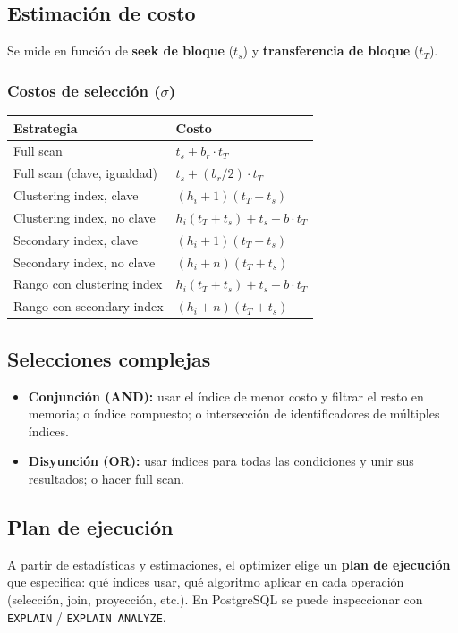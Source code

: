 \documentclass[12pt, a4paper]{article}
\begin{document}
\subsection{Estimación de costo}
Se mide en función de \textbf{seek de bloque} ($t_s$) y \textbf{transferencia de bloque} ($t_T$).

\subsubsection{Costos de selección ($\sigma$)}

\begin{tabularx}{\textwidth}{Xl}
\toprule
\textbf{Estrategia} & \textbf{Costo} \\
\midrule
Full scan & $t_s + b_r \cdot t_T$ \\
Full scan (clave, igualdad) & $t_s + (b_r/2) \cdot t_T$ \\
Clustering index, clave & $(h_i + 1)(t_T + t_s)$ \\
Clustering index, no clave & $h_i(t_T + t_s) + t_s + b \cdot t_T$ \\
Secondary index, clave & $(h_i + 1)(t_T + t_s)$ \\
Secondary index, no clave & $(h_i + n)(t_T + t_s)$ \\
Rango con clustering index & $h_i(t_T + t_s) + t_s + b \cdot t_T$ \\
Rango con secondary index & $(h_i + n)(t_T + t_s)$ \\
\bottomrule
\end{tabularx}

\subsection{Selecciones complejas}
\begin{itemize}
  \item \textbf{Conjunción (AND):} usar el índice de menor costo y filtrar el resto en memoria; o índice compuesto; o intersección de identificadores de múltiples índices.
  \item \textbf{Disyunción (OR):} usar índices para todas las condiciones y unir sus resultados; o hacer full scan.
\end{itemize}

\subsection{Plan de ejecución}
A partir de estadísticas y estimaciones, el optimizer elige un \textbf{plan de ejecución} que especifica: qué índices usar, qué algoritmo aplicar en cada operación (selección, join, proyección, etc.). En PostgreSQL se puede inspeccionar con \texttt{EXPLAIN} / \texttt{EXPLAIN ANALYZE}.
\end{document}

